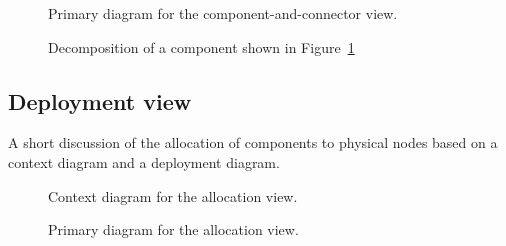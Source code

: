 \documentclass[a4paper,10pt]{article}
\begin{document}
\begin{figure}[!htp]
    \centering
    \caption{Primary diagram for the component-and-connector view.
        }\label{fig:cc_main}
\end{figure}

\begin{figure}[!htp]
    \centering
    \caption{Decomposition of a component shown in Figure~\ref{fig:cc_main}
        }\label{fig:decomp_decomp1}
\end{figure}

\subsection{Deployment view}
A short discussion of the allocation of components to physical nodes based on a
context diagram and a deployment diagram.

\begin{figure}[!htp]
    \centering
    \caption{Context diagram for the allocation view.}\label{fig:depl_context}
\end{figure}

\begin{figure}[!htp]
    \centering
    \caption{Primary diagram for the allocation view.}\label{fig:depl_main}
\end{figure}
\end{document}
